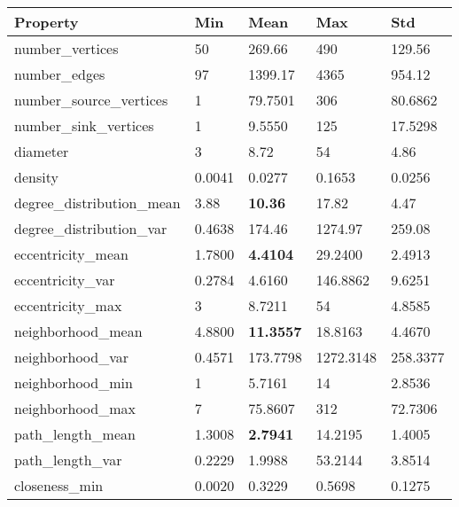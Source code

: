 \documentclass[runningheads]{llncs}
\newcommand{\imagePath}{./}
\begin{document}
\begin{figure}[h!tb]
	\hfill
	\caption{}
\end{figure}

\begin{table}[htb]
	\centering
	\begin{tabular}{|l|l|l|l|l|}
		\hline
		\textbf{Property} & \textbf{Min} & \textbf{Mean} & \textbf{Max} & \textbf{Std} \\
		\hline
		number\_vertices & 50 & 269.66 & 490 & 129.56 \\
		number\_edges & 97 & 1399.17 & 4365 & 954.12 \\
		number\_source\_vertices & 1 & 79.7501 & 306 & 80.6862 \\
		number\_sink\_vertices & 1 & 9.5550 & 125 & 17.5298 \\
		diameter & 3 & 8.72 & 54 & 4.86 \\
		density & 0.0041 & 0.0277 & 0.1653 & 0.0256 \\
		\hline
		degree\_distribution\_mean & 3.88 & \textbf{10.36} & 17.82 & 4.47 \\
		degree\_distribution\_var & 0.4638 & 174.46 & 1274.97 & 259.08 \\
		\hline
		eccentricity\_mean & 1.7800 & \textbf{4.4104} & 29.2400 & 2.4913 \\
		eccentricity\_var & 0.2784 & 4.6160 & 146.8862 & 9.6251 \\
		eccentricity\_max & 3 & 8.7211 & 54 & 4.8585 \\
		\hline
		neighborhood\_mean & 4.8800 & \textbf{11.3557} & 18.8163 & 4.4670 \\
		neighborhood\_var & 0.4571 & 173.7798 & 1272.3148 & 258.3377 \\
		neighborhood\_min & 1 & 5.7161 & 14 & 2.8536 \\
		neighborhood\_max & 7 & 75.8607 & 312 & 72.7306 \\
		\hline
		path\_length\_mean & 1.3008 & \textbf{2.7941} & 14.2195 & 1.4005 \\
		path\_length\_var & 0.2229 & 1.9988 & 53.2144 & 3.8514 \\
		\hline
		closeness\_min & 0.0020 & 0.3229 & 0.5698 & 0.1275 \\

\end{tabular}
\end{table}
\end{document}
